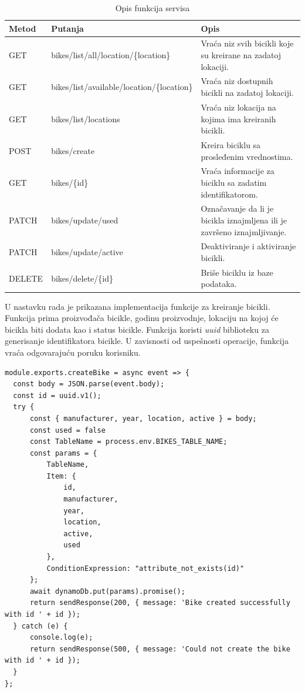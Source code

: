 \documentclass[12pt,oneside]{memoir}
\begin{document}
\begin{table}
  \centering
  \caption{Opis funkcija servisa}
  \label{tbl:funkcije}
  \begin{tabular}{|p{2cm}|p{7cm}|p{4cm}|} %
    \hline
      Metod& Putanja & Opis \\
    \hline
    GET & bikes/list/all/location/\{location\} & Vraća niz svih bicikli koje su kreirane na zadatoj lokaciji.\\
    \hline
    GET & bikes/list/available/location/\{location\} & Vraća niz dostupnih bicikli na zadatoj lokaciji.\\
    \hline
    GET & bikes/list/locations & Vraća niz lokacija na kojima ima kreiranih bicikli.\\
    \hline
    POST & bikes/create & Kreira biciklu sa prosleđenim vrednostima.\\
    \hline
    GET & bikes/\{id\} & Vraća informacije za biciklu sa zadatim identifikatorom.\\
    \hline
    PATCH & bikes/update/used & Označavanje da li je bicikla iznajmljena ili je završeno iznajmljivanje.\\
    \hline
    PATCH & bikes/update/active & Deaktiviranje i aktiviranje bicikli. \\
    \hline
    DELETE & bikes/delete/\{id\} & Briše biciklu iz baze podataka.\\
    \hline
  \end{tabular}
\end{table}

U nastavku rada je prikazana implementacija funkcije za kreiranje bicikli. Funkcija prima proizvođača bicikle, godinu proizvodnje, lokaciju na kojoj će bicikla biti dodata kao i status bicikle. Funkcija koristi \emph{uuid} biblioteku za generisanje identifikatora bicikle. U zavisnosti od uspešnosti operacije, funkcija vraća odgovarajuću poruku korisniku.

\begin{lstlisting}[caption={Primer implementacije funkcije za kreiranje bicikala},captionpos=t]
module.exports.createBike = async event => {
  const body = JSON.parse(event.body);
  const id = uuid.v1();
  try {
      const { manufacturer, year, location, active } = body;
      const used = false
      const TableName = process.env.BIKES_TABLE_NAME;
      const params = {
          TableName,
          Item: {
              id,
              manufacturer,
              year,
              location,
              active,
              used
          },
          ConditionExpression: "attribute_not_exists(id)"
      };
      await dynamoDb.put(params).promise();
      return sendResponse(200, { message: 'Bike created successfully with id ' + id });
  } catch (e) {
      console.log(e);
      return sendResponse(500, { message: 'Could not create the bike with id ' + id });
  }
};
\end{lstlisting}
\end{document}
